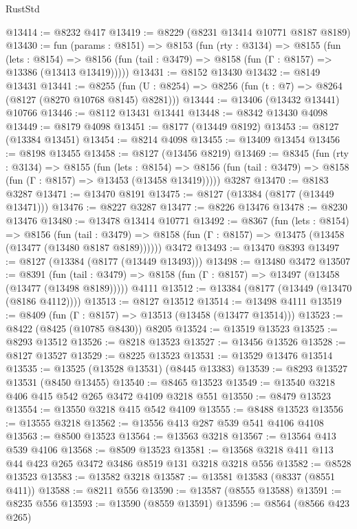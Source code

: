 \begin{lexlean}{RustStd}
\begin{coremodule}
@13414 := @8232 @417
@13419 := @8229 (@8231 @13414 @10771 @8187 @8189)
@13430 := fun (params : @8151) =>
  @8153
    (fun (rty : @3134) =>
    @8155
      (fun (lets : @8154) =>
      @8156 (fun (tail : @3479) => @8158 (fun (Γ : @8157) => @13386 (@13413 @13419)))))
@13431 := @8152 @13430
@13432 := @8149 @13431
@13441 := @8255
    (fun (U : @8254) => @8256 (fun (t : @7) => @8264 (@8127 (@8270 @10768 @8145) @8281)))
@13444 := @13406 (@13432 @13441) @10766
@13446 := @8112 @13431 @13441
@13448 := @8342 @13430 @4098
@13449 := @8179 @4098
@13451 := @8177 (@13449 @8192)
@13453 := @8127 (@13384 @13451)
@13454 := @8214 @4098
@13455 := @13409 @13454
@13456 := @8198 @13455
@13458 := @8127 (@13456 @8219)
@13469 := @8345
    (fun (rty : @3134) =>
    @8155
      (fun (lets : @8154) =>
      @8156 (fun (tail : @3479) => @8158 (fun (Γ : @8157) => @13453 (@13458 @13419)))))
    @3287
@13470 := @8183 @3287
@13471 := @13470 @8191
@13475 := @8127 (@13384 (@8177 (@13449 @13471)))
@13476 := @8227 @3287
@13477 := @8226 @13476
@13478 := @8230 @13476
@13480 := @13478 @13414 @10771
@13492 := @8367
    (fun (lets : @8154) =>
    @8156
      (fun (tail : @3479) =>
      @8158 (fun (Γ : @8157) => @13475 (@13458 (@13477 (@13480 @8187 @8189))))))
    @3472
@13493 := @13470 @8393
@13497 := @8127 (@13384 (@8177 (@13449 @13493)))
@13498 := @13480 @3472
@13507 := @8391
    (fun (tail : @3479) => @8158 (fun (Γ : @8157) => @13497 (@13458 (@13477 (@13498 @8189)))))
    @4111
@13512 := @13384 (@8177 (@13449 (@13470 (@8186 @4112))))
@13513 := @8127 @13512
@13514 := @13498 @4111
@13519 := @8409 (fun (Γ : @8157) => @13513 (@13458 (@13477 @13514)))
@13523 := @8422 (@8425 (@10785 @8430)) @8205
@13524 := @13519 @13523
@13525 := @8293 @13512
@13526 := @8218 @13523
@13527 := @13456 @13526
@13528 := @8127 @13527
@13529 := @8225 @13523
@13531 := @13529 @13476 @13514
@13535 := @13525 (@13528 @13531) (@8445 @13383)
@13539 := @8293 @13527 @13531 (@8450 @13455)
@13540 := @8465 @13523
@13549 := @13540 @3218 @406 @415 @542 @265 @3472 @4109 @3218 @551
@13550 := @8479 @13523
@13554 := @13550 @3218 @415 @542 @4109
@13555 := @8488 @13523
@13556 := @13555 @3218
@13562 := @13556 @413 @287 @539 @541 @4106 @4108
@13563 := @8500 @13523
@13564 := @13563 @3218
@13567 := @13564 @413 @539 @4106
@13568 := @8509 @13523
@13581 := @13568 @3218 @411 @113 @44 @423 @265 @3472 @3486 @8519 @131 @3218 @3218 @556
@13582 := @8528 @13523
@13583 := @13582 @3218
@13587 := @13581 @13583 (@8337 (@8551 @411))
@13588 := @8211 @556
@13590 := @13587 (@8555 @13588)
@13591 := @8235 @556
@13593 := @13590 (@8559 @13591)
@13596 := @8564 (@8566 @423 @265)

\end{coremodule}
\end{lexlean}

